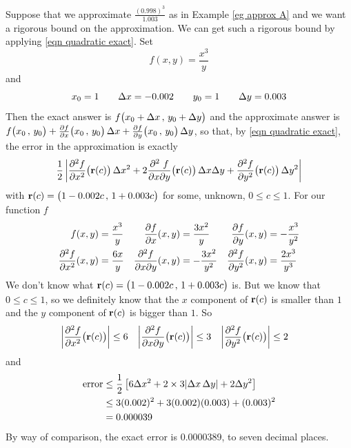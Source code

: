 \begin{eg}\label{eg error}
Suppose that we approximate
$\frac{(0.998)^3}{1.003}$ as in Example \ref{eg approx A}
 and we want a rigorous
bound on the approximation. We can get such a rigorous bound by 
applying \eqref{eqn quadratic exact}. Set 
\begin{equation*}
f(x,y)=\frac{x^3}{y}
\end{equation*}
and
\begin{equation*}
x_0=1\qquad 
\Delta x=-0.002\qquad
y_0=1\qquad
\Delta y=0.003
\end{equation*}
Then the exact answer is $f\big(x_0 + \Delta x\,,\,y_0+\Delta y\big)$
and the approximate answer is $f\big(x_0\,,\,y_0\big) 
       + \pdiff{f}{x}\big(x_0\,,\,y_0\big)\,\De x
       + \pdiff{f}{y}\big(x_0\,,\,y_0\big)\,\De y$,
so that, by \eqref{eqn quadratic exact}, the error in the
approximation is exactly
\begin{align*}
\frac{1}{2}\left|
        \frac{\partial^2 f}{\partial x^2}\big(\mathbf{r}(c)\big)\,\Delta x^2
       +2\frac{\partial^2\ f}{\partial x\partial y}
                                     \big(\mathbf{r}(c)\big) \,\Delta x\Delta y 
       + \frac{\partial^2 f}{\partial y^2}\big(\mathbf{r}(c)\big)\,\Delta y^2
       \right|
\end{align*}
with
   $\mathbf{r}(c) = \big(1-0.002 c\,,\,1+0.003 c\big)$
for some, unknown, $0\le c\le 1$. For our function $f$
\begin{align*}
f(x,y)&=\frac{x^3}{y} &
\pdiff{f}{x}(x,y)&=\frac{3 x^2}{y} &
\pdiff{f}{y}(x,y)&=-\frac{x^3}{y^2} \\
\frac{\partial^2 f}{\partial x^2}(x,y)&=\frac{6 x}{y} &
\frac{\partial^2 f}{\partial x\partial y}(x,y)&=-\frac{3 x^2}{y^2} &
\frac{\partial^2 f}{\partial y^2}(x,y)&=\frac{2 x^3}{y^3} 
\end{align*}
We don't know what $\mathbf{r}(c)=\big(1-0.002 c\,,\,1+0.003 c\big)$ is. 
But we know that $0\le c\le 1$, so we definitely know that the $x$ component
of $\mathbf{r}(c)$ is smaller than $1$ and the $y$ component of $\mathbf{r}(c)$ is bigger
than $1$. So
\begin{align*}
\left|\frac{\partial^2 f}{\partial x^2}\big(\mathbf{r}(c)\big)\right|&\le 6 &
\left|\frac{\partial^2 f}{\partial x\partial y}\big(\mathbf{r}(c)\big)\right|&\le 3 &
\left|\frac{\partial^2 f}{\partial y^2}\big(\mathbf{r}(c)\big)\right|&\le 2
\end{align*}
and
\begin{align*}
\text{error}
&\le \frac{1}{2}\left[6\Delta x^2  +2\times 3 |\Delta x\,\Delta y| +2\Delta y^2\right] \\
&\le 3(0.002)^2 + 3(0.002)(0.003) +(0.003)^2 \\
&= 0.000039
\end{align*}
By way of comparison, the exact error is 0.0000389, to seven decimal places.
\end{eg}

